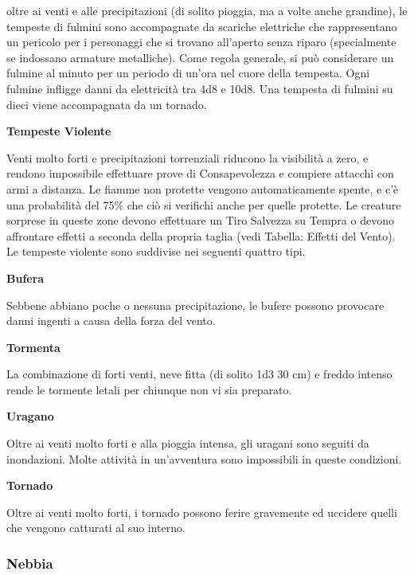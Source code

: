 \begin{multicols}{2}
oltre ai venti e alle precipitazioni (di solito pioggia, ma a volte anche grandine), le tempeste di fulmini sono accompagnate da scariche elettriche che rappresentano un pericolo per i personaggi che si trovano all'aperto senza riparo (specialmente se indossano armature metalliche). Come regola generale, si può considerare un fulmine al minuto per un periodo di un'ora nel cuore della tempesta. Ogni fulmine infligge danni da elettricità tra 4d8 e 10d8. Una tempesta di fulmini su dieci viene accompagnata da un tornado.

\textbf{Tempeste Violente}

Venti molto forti e precipitazioni torrenziali riducono la visibilità a zero, e rendono impossibile effettuare prove di Consapevolezza e compiere attacchi con armi a distanza. Le fiamme non protette vengono automaticamente spente, e c'è una probabilità del 75\% che ciò si verifichi anche per quelle protette. Le creature sorprese in queste zone devono effettuare un Tiro Salvezza su Tempra o devono affrontare effetti a seconda della propria taglia (vedi Tabella: Effetti del Vento). Le tempeste violente sono suddivise nei seguenti quattro tipi.





\textbf{Bufera}

Sebbene abbiano poche o nessuna precipitazione, le bufere possono provocare danni ingenti a causa della forza del vento.

\textbf{Tormenta}

La combinazione di forti venti, neve fitta (di solito 1d3 \texttimes{} 30 cm) e freddo intenso rende le tormente letali per chiunque non vi sia preparato.

\textbf{Uragano}

Oltre ai venti molto forti e alla pioggia intensa, gli uragani sono seguiti da inondazioni. Molte attività in un'avventura sono impossibili in queste condizioni.

\textbf{Tornado}

Oltre ai venti molto forti, i tornado possono ferire gravemente ed uccidere quelli che vengono catturati al suo interno.

\subsubsection{Nebbia}


\end{multicols}
